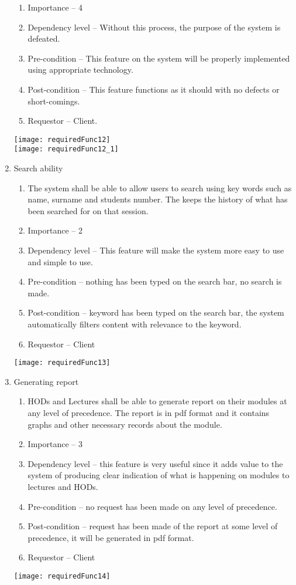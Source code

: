 \documentclass[12pt, a4paper]{scrartcl}
\begin{document}
\begin{enumerate}
\begin{enumerate}
					\item Importance – 4
					\item Dependency level – Without this process, the purpose of the system is defeated.
					\item Pre-condition – This feature on the system will be properly implemented using appropriate technology.
					\item Post-condition – This feature functions as it should with no defects or short-comings.
					\item Requestor – Client.

					\end{enumerate}
					\texttt{[image: requiredFunc12]}\\
					\texttt{[image: requiredFunc12\_1]}
					\item Search ability
					\begin{enumerate}
					\item The system shall be able to allow users to search using key words such as name, surname and students number. The keeps the history of what has been searched for on that session.
					\item Importance – 2
					\item Dependency level – This feature will make the system more easy to use and simple to use.
					\item Pre-condition – nothing has been typed on the search bar, no search is made.
					\item Post-condition – keyword has been typed on the search bar, the system automatically filters content with relevance to the keyword.
					\item Requestor – Client
					\end{enumerate}
					\texttt{[image: requiredFunc13]}
					\item Generating report
					\begin{enumerate}
					\item HODs and Lectures shall be able to generate report on their modules at any level of precedence. The report is in pdf format and it contains graphs and other necessary records about the module.
					\item Importance – 3
					\item Dependency level – this feature is very useful since it adds value to the system of producing clear indication of what is happening on modules to lectures and HODs.
					\item Pre-condition – no request has been made on any level of precedence.
					\item Post-condition – request has been made of the report at some level of precedence, it will be generated in pdf format.
					\item Requestor – Client
					\end{enumerate}
					\texttt{[image: requiredFunc14]}
				\end{enumerate}
\end{document}
